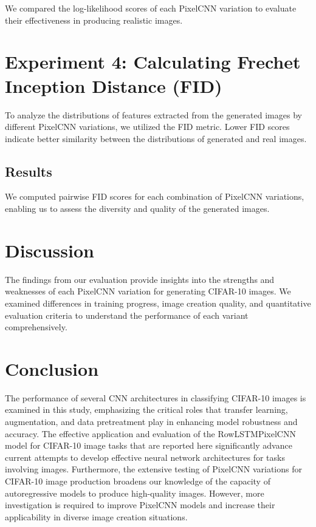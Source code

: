\documentclass{article}
\begin{document}
We compared the log-likelihood scores of each PixelCNN variation to evaluate their effectiveness in producing realistic images.

\section{Experiment 4: Calculating Frechet Inception Distance (FID)}

To analyze the distributions of features extracted from the generated images by different PixelCNN variations, we utilized the FID metric. Lower FID scores indicate better similarity between the distributions of generated and real images.

\subsection{Results}

We computed pairwise FID scores for each combination of PixelCNN variations, enabling us to assess the diversity and quality of the generated images.

\section{Discussion}

The findings from our evaluation provide insights into the strengths and weaknesses of each PixelCNN variation for generating CIFAR-10 images. We examined differences in training progress, image creation quality, and quantitative evaluation criteria to understand the performance of each variant comprehensively.

\section{Conclusion}
The performance of several CNN architectures in classifying CIFAR-10 images is examined in this study, emphasizing the critical roles that transfer learning, augmentation, and data pretreatment play in enhancing model robustness and accuracy. The effective application and evaluation of the RowLSTMPixelCNN model for CIFAR-10 image tasks that are reported here significantly advance current attempts to develop effective neural network architectures for tasks involving images. Furthermore, the extensive testing of PixelCNN variations for CIFAR-10 image production broadens our knowledge of the capacity of autoregressive models to produce high-quality images. However, more investigation is required to improve PixelCNN models and increase their applicability in diverse image creation situations.
\end{document}
